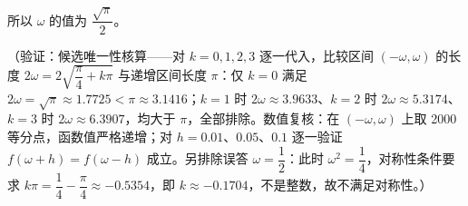 \begin{answer}
所以 \(\omega\) 的值为 \(\dfrac{\sqrt\pi}{2}\)。

（验证：候选唯一性核算——对 \(k=0,1,2,3\) 逐一代入，比较区间 \((-\omega,\omega)\) 的长度 \(2\omega=2\sqrt{\dfrac{\pi}{4}+k\pi}\) 与递增区间长度 \(\pi\)：仅 \(k=0\) 满足 \(2\omega=\sqrt\pi\approx1.7725<\pi\approx3.1416\)；\(k=1\) 时 \(2\omega\approx3.9633\)、\(k=2\) 时 \(2\omega\approx5.3174\)、\(k=3\) 时 \(2\omega\approx6.3907\)，均大于 \(\pi\)，全部排除。数值复核：在 \((-\omega,\omega)\) 上取 2000 等分点，函数值严格递增；对 \(h=0.01\)、\(0.05\)、\(0.1\) 逐一验证 \(f(\omega+h)=f(\omega-h)\) 成立。另排除误答 \(\omega=\dfrac12\)：此时 \(\omega^{2}=\dfrac14\)，对称性条件要求 \(k\pi=\dfrac14-\dfrac{\pi}{4}\approx-0.5354\)，即 \(k\approx-0.1704\)，不是整数，故不满足对称性。）


\end{answer}
